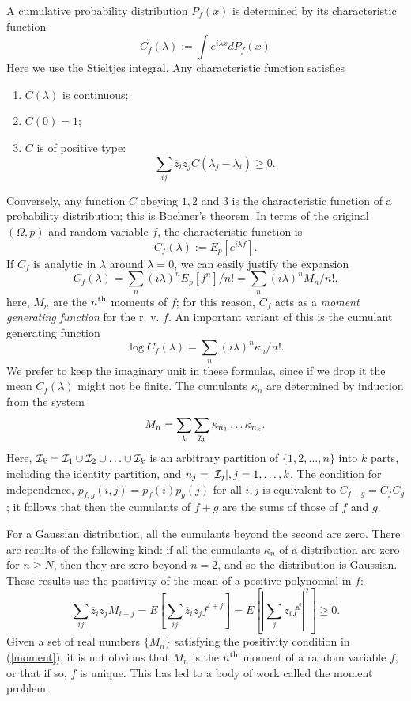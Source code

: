 A cumulative probability distribution $P_f(x)$ is determined by its
characteristic function
\begin{equation}
C_f(\lambda):=\int e^{i\lambda x}dP_f(x)
\end{equation}
Here we use the Stieltjes integral. Any characteristic function satisfies
\begin{enumerate}
\item $C(\lambda)$ is continuous;
\item $C(0)=1$;
\item $C$ is of positive type:
\[\sum_{ij}\overline{z}_iz_jC(\lambda_j-\lambda_i)\geq0.\]
\end{enumerate}
Conversely, any function $C$ obeying $1,2$ and $3$ is the characteristic
function of a probability distribution; this is Bochner's theorem.
In terms of the original $(\Omega,p)$ and random variable $f$, the
characteristic function is
\begin{equation}
C_f(\lambda):=E_p[e^{i\lambda f}].
\end{equation}
If $C_f$ is analytic in $\lambda$ around $\lambda=0$, we can easily
justify the expansion
\[C_f(\lambda)=\sum_n(i\lambda)^nE_p[f^n]/n!=\sum_n(i\lambda)^nM_n/n!.\]
here, $M_n$ are the $n^{\rm th}$ moments of $f$; for this reason,
$C_f$ acts as a {\em moment generating function} for the r. v. $f$.
An important variant of this is the cumulant generating function
\[ \log C_f(\lambda)=\sum_n(i\lambda)^n\kappa_n/n!.\]
We prefer to keep the imaginary unit in these formulas, since if we
drop it the mean $C_f(\lambda)$ might not be finite.
The cumulants $\kappa_n$ are determined by induction from the system
\begin{equation}
M_n=\sum_k\sum_{{\cal I}_k}\kappa_{n_1}\ldots\kappa_{n_k}.
\label{cumulants}
\end{equation}
Here, ${\cal I}_k={\cal I}_1\cup{\cal I}_2\cup\ldots\cup{\cal I}_k$
is an arbitrary partition of $\{1,2,\ldots,n\}$ into $k$ parts,
including the identity partition, and $n_j=|{\cal I}_j|, j=1,\ldots,k$.
The condition for independence, $p_{f,g}(i,j)=p_f(i)p_g(j)$ for all $i,j$ is equivalent to
$C_{f+g}=C_fC_g$; it follows that then the cumulants of $f+g$ are the sums
of those of $f$ and $g$.

For a Gaussian distribution, all the cumulants beyond the second are zero.
There are results of the following kind: if all the cumulants
$\kappa_n$ of a distribution are zero for $n\geq N$, then they are zero
beyond $n=2$, and so the distribution is Gaussian.
These results use the positivity of the mean of a positive polynomial in $f$:
\begin{equation}
\sum_{ij}\overline{z}_iz_jM_{i+j}=E[\sum_{ij}\overline{z}_iz_jf^{i+j}]=
E[|\sum_jz_if^j|^2]\geq0.
\label{moment}
\end{equation}
Given a set of real numbers $\{M_n\}$ satisfying the positivity condition in
(\ref{moment}), it is
not obvious that $M_n$ is the $n^{\rm th}$ moment of a random variable $f$,
or that if so, $f$ is unique.
This has led to a body of work called the moment problem.

